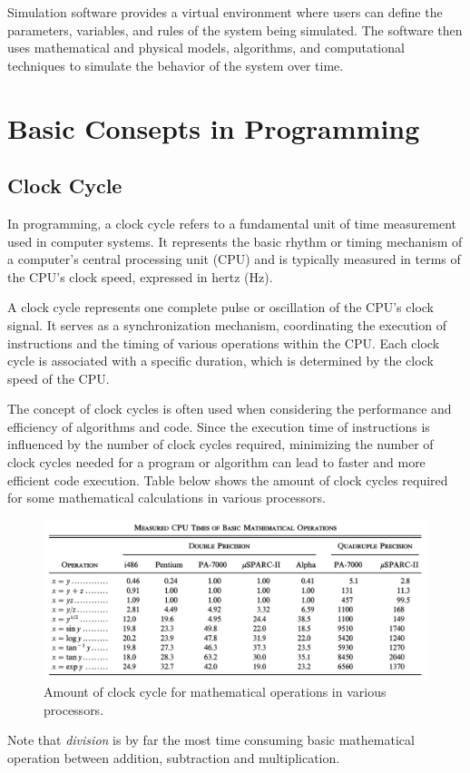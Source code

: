 \documentclass[a4paper,oneside,12pt]{report}
\numberwithin{equation}{chapter}
\begin{document}
Simulation software provides a virtual environment where users can define the parameters,
variables, and rules of the system being simulated. The software then uses mathematical and physical models, 
algorithms, and computational techniques to simulate the behavior of the system over time.

\section{Basic Consepts in Programming}

\subsection{Clock Cycle}

In programming, a clock cycle refers to a fundamental unit of time measurement used in computer systems. 
It represents the basic rhythm or timing mechanism of a computer's central processing unit (CPU) and is typically measured in terms of the CPU's clock speed, expressed in hertz (Hz).

A clock cycle represents one complete pulse or oscillation of the CPU's clock signal. 
It serves as a synchronization mechanism, coordinating the execution of instructions and the timing of various operations within the CPU.
Each clock cycle is associated with a specific duration, which is determined by the clock speed of the CPU.

The concept of clock cycles is often used when considering the performance and efficiency of algorithms and code. 
Since the execution time of instructions is influenced by the number of clock cycles required, minimizing the number of clock cycles needed for a program or algorithm can lead to faster and more efficient code execution.
Table below shows the amount of clock cycles required for some mathematical calculations in various processors.
\begin{figure}[h!]
    \centering
    \includegraphics[width=.9\textwidth]{./figures/cpu_instruction_speed.png}
    \caption{Amount of clock cycle for mathematical operations in various processors. \cite{cpu_instruction_speed}}
\end{figure}
Note that \textit{division} is by far the most time consuming basic mathematical operation between addition, subtraction and multiplication.
\end{document}
